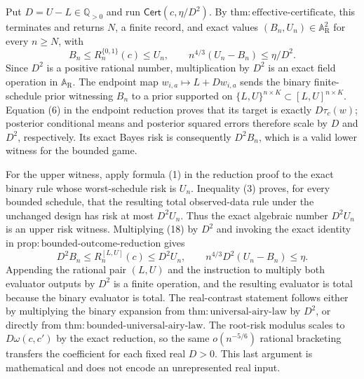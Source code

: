 Put \(D=U-L\in\mathbb Q_{>0}\) and run \(\mathsf{Cert}(c,\eta/D^2)\).  By \(\mathrm{thm:effective\text{-}certificate}\), this terminates and returns \(N\), a finite record, and exact values \((B_n,U_n)\in\mathbb A_{\mathrm R}^2\) for every \(n\ge N\), with
\[
B_n\le R_n^{\{0,1\}}(c)\le U_n,
\qquad
n^{4/3}(U_n-B_n)\le\eta/D^2.
\tag{18}
\]
Since \(D^2\) is a positive rational number, multiplication by \(D^2\) is an exact field operation in \(\mathbb A_{\mathrm R}\).  The endpoint map \(w_{i,a}\mapsto L+Dw_{i,a}\) sends the binary finite-schedule prior witnessing \(B_n\) to a prior supported on \(\{L,U\}^{n\times K}\subset[L,U]^{n\times K}\).  Equation (6) in the endpoint reduction proves that its target is exactly \(D\tau_c(w)\); posterior conditional means and posterior squared errors therefore scale by \(D\) and \(D^2\), respectively.  Its exact Bayes risk is consequently \(D^2B_n\), which is a valid lower witness for the bounded game.

For the upper witness, apply formula (1) in the reduction proof to the exact binary rule whose worst-schedule risk is \(U_n\).  Inequality (3) proves, for every bounded schedule, that the resulting total observed-data rule under the unchanged design has risk at most \(D^2U_n\).  Thus the exact algebraic number \(D^2U_n\) is an upper risk witness.  Multiplying (18) by \(D^2\) and invoking the exact identity in \(\mathrm{prop:bounded\text{-}outcome\text{-}reduction}\) gives
\[
D^2B_n\le R_n^{[L,U]}(c)\le D^2U_n,
\qquad
n^{4/3}D^2(U_n-B_n)\le\eta.
\]
Appending the rational pair \((L,U)\) and the instruction to multiply both evaluator outputs by \(D^2\) is a finite operation, and the resulting evaluator is total because the binary evaluator is total.  The real-contrast statement follows either by multiplying the binary expansion from \(\mathrm{thm:universal\text{-}airy\text{-}law}\) by \(D^2\), or directly from \(\mathrm{thm:bounded\text{-}universal\text{-}airy\text{-}law}\).  The root-risk modulus scales to \(D\omega(c,c')\) by the exact reduction, so the same \(o(n^{-5/6})\) rational bracketing transfers the coefficient for each fixed real \(D>0\).  This last argument is mathematical and does not encode an unrepresented real input.
